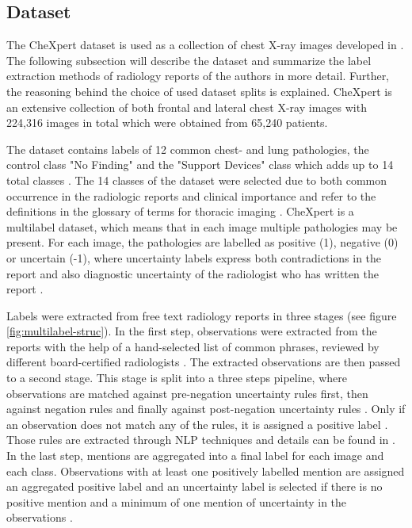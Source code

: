 \subsection{Dataset}
\label{section: dataset}
The CheXpert dataset is used as a collection of chest X-ray images developed in \citep{Irvin2019}.
The following subsection will describe the dataset and summarize the label extraction methods of radiology reports of the authors in more detail.
Further, the reasoning behind the choice of used dataset splits is explained. 
CheXpert is an extensive collection of both frontal and lateral chest X-ray images with 224,316 images in total which were obtained from 65,240 patients.
\par
The dataset contains labels of 12 common chest- and lung pathologies, the control class "No Finding" and the "Support Devices" class which adds up to 14 total classes \citep{Irvin2019}.
The 14 classes of the dataset were selected due to both common occurrence in the radiologic reports and clinical importance \citep{Irvin2019} and refer to the definitions in the glossary of terms for thoracic imaging \citep{Hansell2008}.   
CheXpert is a multilabel dataset, which means that in each image multiple pathologies may be present.
For each image, the pathologies are labelled as positive (1), negative (0) or uncertain (-1), where uncertainty labels express both contradictions in the report and also diagnostic uncertainty of the radiologist who has written the report \citep{Irvin2019}.
\par
Labels were extracted from free text radiology reports in three stages (see figure \ref{fig:multilabel-struc}).
In the first step, observations were extracted from the reports with the help of a hand-selected list of common phrases, reviewed by different board-certified radiologists \citep{Irvin2019}.
The extracted observations are then passed to a second stage.
This stage is split into a three steps pipeline, where observations are matched against pre-negation uncertainty rules first, then against negation rules and finally against post-negation uncertainty rules \citep{Irvin2019}.
Only if an observation does not match any of the rules, it is assigned a positive label \citep{Irvin2019}.
Those rules are extracted through NLP techniques and details can be found in \citep{Irvin2019}.
In the last step, mentions are aggregated into a final label for each image and each class.
Observations with at least one positively labelled mention are assigned an aggregated positive label and an uncertainty label is selected if there is no positive mention and a minimum of one mention of uncertainty in the observations \citep{Irvin2019}.
